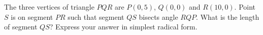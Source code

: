 The three vertices of triangle $PQR$ are $P(0,5)$, $Q(0,0)$ and $R(10,0)$. Point $S$ is on segment $PR$ such that segment $QS$ bisects angle $RQP$. What is the length of segment $QS$? Express your answer in simplest radical form.
